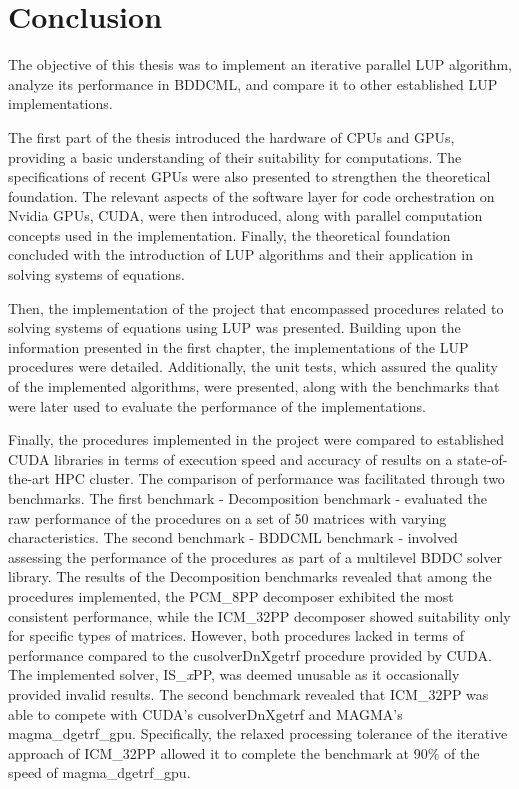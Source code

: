 \chapter*{Conclusion}				   	   %

The objective of this thesis was to implement an iterative parallel LUP algorithm, analyze its performance in BDDCML, and compare it to other established LUP implementations.

The first part of the thesis introduced the hardware of CPUs and GPUs, providing a basic understanding of their suitability for computations. The specifications of recent GPUs were also presented to strengthen the theoretical foundation. The relevant aspects of the software layer for code orchestration on Nvidia GPUs, CUDA, were then introduced, along with parallel computation concepts used in the implementation. Finally, the theoretical foundation concluded with the introduction of LUP algorithms and their application in solving systems of equations.

Then, the implementation of the project that encompassed procedures related to solving systems of equations using LUP was presented. Building upon the information presented in the first chapter, the implementations of the LUP procedures were detailed. Additionally, the unit tests, which assured the quality of the implemented algorithms, were presented, along with the benchmarks that were later used to evaluate the performance of the implementations.

Finally, the procedures implemented in the project were compared to established CUDA libraries in terms of execution speed and accuracy of results on a state-of-the-art HPC cluster. The comparison of performance was facilitated through two benchmarks. The first benchmark - Decomposition benchmark - evaluated the raw performance of the procedures on a set of 50 matrices with varying characteristics. The second benchmark - BDDCML benchmark - involved assessing the performance of the procedures as part of a multilevel BDDC solver library. The results of the Decomposition benchmarks revealed that among the procedures implemented, the PCM\_8PP decomposer exhibited the most consistent performance, while the ICM\_32PP decomposer showed suitability only for specific types of matrices. However, both procedures lacked in terms of performance compared to the cusolverDnXgetrf procedure provided by CUDA. The implemented solver, IS\_\textit{x}PP, was deemed unusable as it occasionally provided invalid results. The second benchmark revealed that ICM\_32PP was able to compete with CUDA's cusolverDnXgetrf and MAGMA's magma\_dgetrf\_gpu. Specifically, the relaxed processing tolerance of the iterative approach of ICM\_32PP allowed it to complete the benchmark at 90\% of the speed of magma\_dgetrf\_gpu.

